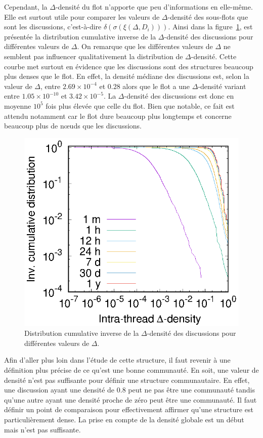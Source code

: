 Cependant, la $\Delta$-densité du flot n'apporte que peu d'informations en elle-même.
Elle est surtout utile pour comparer les valeurs de $\Delta$-densité des sous-flots que sont les discussions, c'est-à-dire  $\delta(\sigma(\xi(\Delta,D_i)))$.
Ainsi dans la figure~\ref{fig:intra_dens_discussion}, est présentée la distribution cumulative inverse de la $\Delta$-densité des discussions pour différentes valeurs de $\Delta$.
On remarque que les différentes valeurs de $\Delta$ ne semblent pas influencer qualitativement la distribution de $\Delta$-densité.
Cette courbe met surtout en évidence que les discussions sont des structures beaucoup plus denses que le flot.
En effet, la densité médiane des discussions est, selon la valeur de $\Delta$, entre $2.69 \times 10^{-4}$ et $0.28$ alors que le flot a une $\Delta$-densité variant entre $1.05  \times 10^{-10}$ et $3.42 \times 10^{-5}$.
La $\Delta$-densité des discussions est donc en moyenne $10^{5}$ fois plus élevée que celle du flot.
Bien que notable, ce fait est attendu notamment car le flot dure beaucoup plus longtemps et concerne beaucoup plus de n\oe uds que les discussions.
\begin{figure}
\centering
	\includegraphics[width=0.48\linewidth]{img/mailing/delta.eps}

\caption{Distribution cumulative inverse de la $\Delta$-densité des discussions pour différentes valeurs de $\Delta$.}
\label{fig:intra_dens_discussion}
\end{figure}

Afin d'aller plus loin dans l'étude de cette structure, il faut revenir à une définition plus précise de ce qu'est une bonne communauté.
En soit, une valeur de densité n'est pas suffisante pour définir une structure communautaire.
En effet, une discussion ayant une densité de $0.8$ peut  ne pas être une communauté tandis qu'une autre ayant une densité proche de zéro peut être une communauté.
Il faut définir un point de comparaison pour effectivement affirmer qu'une structure est particulièrement dense.
La prise en compte de la densité globale est un début mais n'est pas suffisante.

